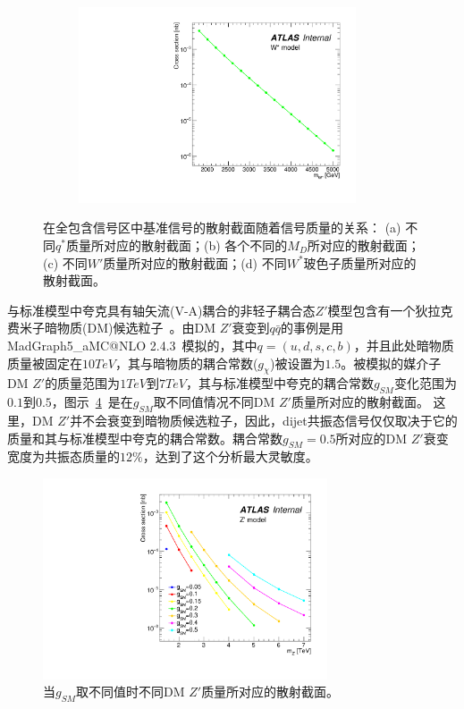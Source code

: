 \begin{figure}[htbp]
\begin{subfigure}{.5\textwidth}
   \caption{}
   \label{fig:WPrime}
  \end{subfigure}
  \begin{subfigure}{.5\textwidth}
  \centering
   \includegraphics[width=0.9\textwidth]{figuresDijet/03-BenchmarkSignals/Xsec_Wstar.pdf}
   \caption{}
   \label{fig:WStar}
  \end{subfigure}
  \caption{
在全包含信号区中基准信号的散射截面随着信号质量的关系：
(a) 不同$q^*$质量所对应的散射截面；(b) 各个不同的$M_{D}$所对应的散射截面；(c) 不同$W\prime$质量所对应的散射截面；(d) 不同$W^*$玻色子质量所对应的散射截面。
  }
  \label{fig:Data1}
\end{figure} 



与标准模型中夸克具有轴矢流(V-A)耦合的非轻子耦合态$Z\prime$模型包含有一个狄拉克费米子暗物质(DM)候选粒子~\cite{DM3}。由DM $Z\prime$衰变到$q\bar{q}$的事例是用MadGraph5\_aMC@NLO 2.4.3~\cite{Alwall:2014hca}模拟的，其中$q=(u,d,s,c,b)$，并且此处暗物质质量被固定在$10TeV$，其与暗物质的耦合常数($g_\chi$)被设置为$1.5$。被模拟的媒介子DM $Z\prime$的质量范围为$1TeV$到$7TeV$，其与标准模型中夸克的耦合常数$g_{SM}$变化范围为$0.1$到$0.5$，图示~\ref{fig:Data2}~是在$g_{SM}$取不同值情况不同DM $Z\prime$质量所对应的散射截面。
这里，DM $Z\prime$并不会衰变到暗物质候选粒子，因此，dijet共振态信号仅仅取决于它的质量和其与标准模型中夸克的耦合常数。耦合常数$g_{SM}=0.5$所对应的DM $Z\prime$衰变宽度为共振态质量的$12\%$，达到了这个分析最大灵敏度。

\begin{figure}[thbp]
  \centering
  \includegraphics[width=0.75\textwidth]{figuresDijet/03-BenchmarkSignals/Xsec_Zprime.pdf}
  \caption{  当$g_{SM}$取不同值时不同DM $Z\prime$质量所对应的散射截面。}
  \label{fig:Data2}
\end{figure}

